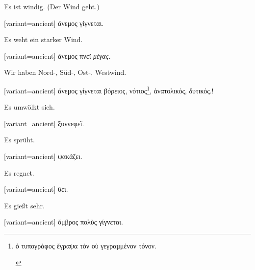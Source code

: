 Es ist windig. (Der Wind geht.)

\switchcolumn

\begin{greek}[variant=ancient]%
ἄνεμος γίγνεται.

\end{greek}%
\switchcolumn*

Es weht ein starker Wind.

\switchcolumn

\begin{greek}[variant=ancient]%
ἄνεμος πνεῖ \emph{μέγας.}

\end{greek}%
\switchcolumn*

Wir haben Nord-, Süd-, Ost-, Westwind.

\switchcolumn

\begin{greek}[variant=ancient]%
ἄνεμος γίγνεται βόρειος, νότιος\footnote{\begin{latin}%
\textgreek[variant=ancient]{ὁ τυπογράφος ἔγραψα τὸν οὐ γεγραμμένον
τόνον.}\end{latin}%
}, ἀνατολικός, δυτικός.!

\end{greek}%
\switchcolumn*

Es umwölkt sich.

\switchcolumn

\begin{greek}[variant=ancient]%
ξυννεφεῖ.

\end{greek}%
\switchcolumn*

Es sprüht.

\switchcolumn

\begin{greek}[variant=ancient]%
ψακάζει.

\end{greek}%
\switchcolumn*

Es regnet.

\switchcolumn

\begin{greek}[variant=ancient]%
ὕει.

\end{greek}%
\switchcolumn*

Es gießt sehr.

\switchcolumn

\begin{greek}[variant=ancient]%
ὄμβρος πολὺς γίγνεται.

\end{greek}%
\switchcolumn*

